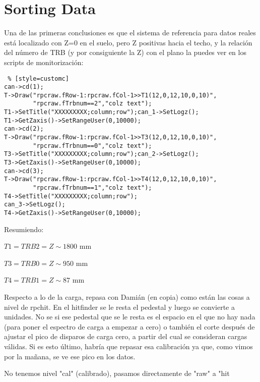 \chapter{Sorting Data}

Una de las primeras conclusiones es que el sistema de referencia para datos reales está localizado con Z=0 en el suelo, pero Z positivas hacia el techo, y la relación del número de TRB (y por consiguiente la Z) con el plano la puedes ver en los scripts de monitorización:

\begin{lstlisting} % [style=customc]
can->cd(1);
T->Draw("rpcraw.fRow-1:rpcraw.fCol-1>>T1(12,0,12,10,0,10)",
        "rpcraw.fTrbnum==2","colz text");
T1->SetTitle("XXXXXXXXX;column;row");can_1->SetLogz();
T1->GetZaxis()->SetRangeUser(0,10000);
can->cd(2);
T->Draw("rpcraw.fRow-1:rpcraw.fCol-1>>T3(12,0,12,10,0,10)",
        "rpcraw.fTrbnum==0","colz text");
T3->SetTitle("XXXXXXXXX;column;row");can_2->SetLogz();
T3->GetZaxis()->SetRangeUser(0,10000);
can->cd(3);
T->Draw("rpcraw.fRow-1:rpcraw.fCol-1>>T4(12,0,12,10,0,10)",
        "rpcraw.fTrbnum==1","colz text");
T4->SetTitle("XXXXXXXXX;column;row");
can_3->SetLogz();
T4->GetZaxis()->SetRangeUser(0,10000);
\end{lstlisting}

Resumiendo:

$T1 = TRB 2 = Z \sim 1800$ mm

$T3 = TRB 0 = Z \sim  950$ mm

$T4 = TRB 1 = Z \sim   87$ mm

Respecto a lo de la carga, repasa con Damián (en copia) como están las cosas a nivel de rpchit. En el hitfinder se le resta el pedestal y luego se convierte a unidades. No se si ese pedestal que se le resta es el espacio en el que no hay nada (para poner el espectro de carga a empezar a cero) o también el corte después de ajustar el pico de disparos de carga cero, a partir del cual se consideran cargas válidas. Si es esto último, habría que repasar esa calibración ya que, como vimos por la mañana, se ve ese pico en los datos.

No tenemos nivel "cal" (calibrado), pasamos directamente de "raw" a "hit
